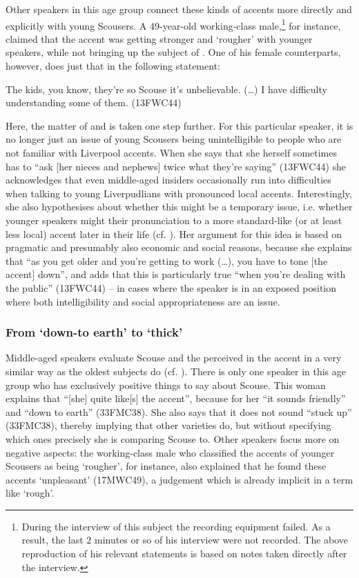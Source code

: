 Other speakers in this age group connect these kinds of accents more directly and explicitly with young Scousers.
A 49-year-old working-class male,\footnote{During the interview of this subject the recording equipment failed. As a result, the last 2 minutes or so of his interview were not recorded. The above reproduction of his relevant statements is based on notes taken directly after the interview.} for instance, claimed that the accent was getting stronger and `rougher' with younger speakers, while not bringing up the subject of .
One of his female counterparts, however, does just that in the following statement:
\begin{example}
	The kids, you know, they're so Scouse it's unbelievable. (\ldots) I have difficulty understanding some of them. (13FWC44)
\end{example}
Here, the matter of  and  is taken one step further.
For this particular speaker, it is no longer just an issue of young Scousers being unintelligible to people who are not familiar with Liverpool accents.
When she says that she herself sometimes has to ``ask [her nieces and nephews] twice what they're saying'' (13FWC44) she acknowledges that even middle-aged insiders occasionally run into difficulties when talking to young Liverpudlians with pronounced local accents.
Interestingly, she also hypothesises about whether this might be a temporary issue, i.e. whether younger speakers might  their pronunciation to a more standard-like (or at least less local) accent later in their life (cf. ).
Her argument for this idea is based on pragmatic and presumably also economic and social reasons, because she explains that ``as you get older and you're getting to work (\ldots), you have to tone [the accent] down'', and adds that this is particularly true ``when you're dealing with the public'' (13FWC44) -- in cases where the speaker is in an exposed position where both intelligibility and social appropriateness are an issue.

\subsubsection{From `down-to earth' to `thick'}
\label{aware_res.eval.mid.like}

Middle-aged speakers evaluate Scouse and the perceived  in the accent in a very similar way as the oldest subjects do (cf. ).
There is only one speaker in this age group who has exclusively positive things to say about Scouse.
This woman explains that ``[she] quite like[s] the accent'', because for her ``it sounds friendly'' and ``down to earth'' (33FMC38).
She also says that it does not sound ``stuck up'' (33FMC38), thereby implying that other varieties do, but without specifying which ones precisely she is comparing Scouse to.
Other speakers focus more on negative aspects: the working-class male who classified the accents of younger Scousers as being `rougher', for instance, also explained that he found these accents `unpleasant' (17MWC49), a judgement which is already implicit in a term like `rough'.

